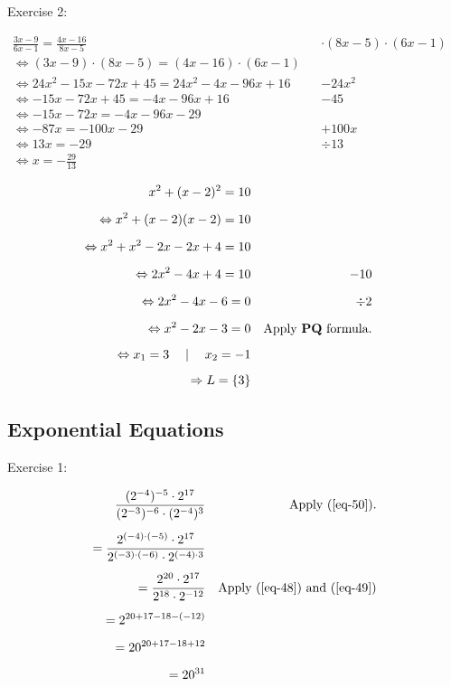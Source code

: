
\newpage Exercise 2: 

\begin{align*}
    \frac{3x-9}{6x-1} = \frac{4x-16}{8x-5} &&\text{$\cdot(8x-5) \cdot(6x-1)$}&\\[1.25ex]
    \Leftrightarrow (3x-9)\cdot(8x-5)=(4x-16)\cdot(6x-1)&\\[1.25ex]
    \Leftrightarrow 24x^2-15x-72x+45 = 24x^2-4x-96x+16 &&\text{$-24x^2$}&\\[1.25ex]
    \Leftrightarrow -15x-72x+45=-4x-96x+16 &&\text{$-45$}&\\[1.25ex]
    \Leftrightarrow -15x-72x = -4x-96x-29&\\[1.25ex]
    \Leftrightarrow -87x = -100x-29&&\text{$+100x$}&\\[1.25ex]
    \Leftrightarrow 13x = -29&&\text{$\div13$}&\\[1.25ex]
    \Leftrightarrow x = -\frac{29}{13}&
\end{align*}


\begin{align*}
    x^2+(x-2)^2 = 10 &\\[1.25ex]
    \Leftrightarrow x^2 + (x-2)(x-2)=10&\\[1.25ex]
    \Leftrightarrow x^2+x^2-2x-2x+4=10&\\[1.25ex]
    \Leftrightarrow 2x^2-4x+4 = 10 &&\text{$-10$}&\\[1.25ex]
    \Leftrightarrow 2x^2-4x-6 = 0 &&\text{$\div 2$}&\\[1.25ex]
    \Leftrightarrow x^2-2x-3 = 0 &&\text{Apply \textbf{PQ} formula.}&\\[1.25ex]
    \Leftrightarrow x_1 = 3 \quad \mid \quad x_2 = -1 &\\[1.25ex]
    \Rightarrow L = \{3\} &
\end{align*}


\newpage 


\vspace{0.5cm}\subsection{Exponential Equations}

\vspace{0.5cm}Exercise 1:

\begin{align*}
    \frac{(2^{-4})^{-5}\cdot2^{17}}{(2^{-3})^{-6}\cdot(2^{-4})^3} &&\text{Apply \bref{eq-50}.} &\\[1.25ex]
    = \frac{2^{(-4)\cdot(-5)}\cdot 2^{17}} {2^{(-3)\cdot(-6)}\cdot2^{(-4)\cdot3 }}&\\[1.25ex]
    = \frac{2^{20} \cdot 2^{17}}{2^{18} \cdot 2^{-12}} &&\text{Apply \bref{eq-48} and \bref{eq-49}}&\\[1.25ex]
    = 2^{20 + 17 - 18 -(-12)} &\\[1.25ex]
    = 20^{20 + 17 -18 + 12} &\\[1.25ex]
    = 20^{31} &
\end{align*}

